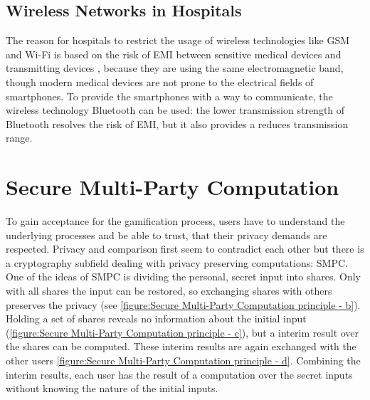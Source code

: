 \subsection{Wireless Networks in Hospitals} \label{Wireless Networks in Hospitals}
The reason for hospitals to restrict the usage of wireless technologies like \gls{GSM} and Wi-Fi is based on the risk of \gls{EMI} between sensitive medical devices and transmitting devices \autocite{Ishihara2014}, because they are using the same electromagnetic band, though modern medical devices are not prone to the electrical fields of smartphones.
To provide the smartphones with a way to communicate, the wireless technology Bluetooth can be used: the lower transmission strength of Bluetooth resolves the risk of \gls{EMI}, but it also provides a reduces transmission range.

\section{Secure Multi-Party Computation} \label{Introduction: Secure Multi-Party Computation}
To gain acceptance for the gamification process, users have to understand the underlying processes and be able to trust, that their privacy demands are respected. Privacy and comparison first seem to contradict each other but there is a cryptography subfield dealing with privacy preserving computations: \gls{SMPC}.
One of the ideas of \gls{SMPC} is dividing the personal, secret input into shares. Only with all shares the input can be restored, so exchanging shares with others preserves the privacy (see \autoref{figure:Secure Multi-Party Computation principle - b}). Holding a set of shares reveals no information about the initial input (\autoref{figure:Secure Multi-Party Computation principle - c}), but a interim result over the shares can be computed. These interim results are again exchanged with the other users \autoref{figure:Secure Multi-Party Computation principle - d}. Combining the interim results, each user has the result of a computation over the secret inputs without knowing the nature of the initial inputs.

